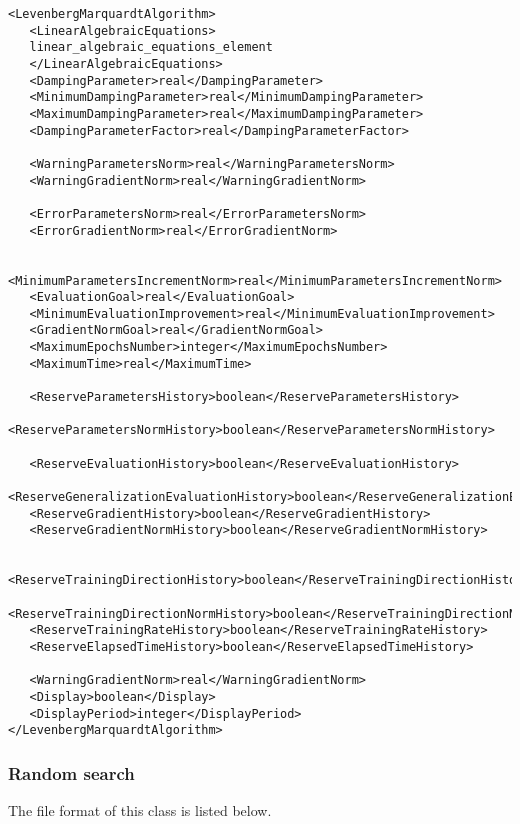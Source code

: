 \begin{lstlisting}
<LevenbergMarquardtAlgorithm>
   <LinearAlgebraicEquations>
   linear_algebraic_equations_element
   </LinearAlgebraicEquations>
   <DampingParameter>real</DampingParameter>
   <MinimumDampingParameter>real</MinimumDampingParameter>
   <MaximumDampingParameter>real</MaximumDampingParameter>
   <DampingParameterFactor>real</DampingParameterFactor>

   <WarningParametersNorm>real</WarningParametersNorm>
   <WarningGradientNorm>real</WarningGradientNorm>

   <ErrorParametersNorm>real</ErrorParametersNorm>
   <ErrorGradientNorm>real</ErrorGradientNorm>
 
   <MinimumParametersIncrementNorm>real</MinimumParametersIncrementNorm>
   <EvaluationGoal>real</EvaluationGoal>
   <MinimumEvaluationImprovement>real</MinimumEvaluationImprovement>
   <GradientNormGoal>real</GradientNormGoal>
   <MaximumEpochsNumber>integer</MaximumEpochsNumber>
   <MaximumTime>real</MaximumTime>
   
   <ReserveParametersHistory>boolean</ReserveParametersHistory>
   <ReserveParametersNormHistory>boolean</ReserveParametersNormHistory>

   <ReserveEvaluationHistory>boolean</ReserveEvaluationHistory>
   <ReserveGeneralizationEvaluationHistory>boolean</ReserveGeneralizationEvaluationHistory>
   <ReserveGradientHistory>boolean</ReserveGradientHistory>
   <ReserveGradientNormHistory>boolean</ReserveGradientNormHistory>
   
   <ReserveTrainingDirectionHistory>boolean</ReserveTrainingDirectionHistory>
   <ReserveTrainingDirectionNormHistory>boolean</ReserveTrainingDirectionNormHistory>
   <ReserveTrainingRateHistory>boolean</ReserveTrainingRateHistory>
   <ReserveElapsedTimeHistory>boolean</ReserveElapsedTimeHistory>
   
   <WarningGradientNorm>real</WarningGradientNorm>
   <Display>boolean</Display>
   <DisplayPeriod>integer</DisplayPeriod>
</LevenbergMarquardtAlgorithm>   
\end{lstlisting}

\subsubsection*{Random search}

The file format of this class is listed below. 

